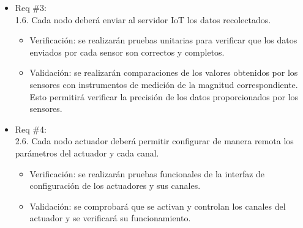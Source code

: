 \begin{itemize}
\begin{itemize}
\begin{itemize}
		            \end{itemize}
		      \item Req \#3: \\ 1.6. Cada nodo deberá enviar al servidor IoT los datos
		            recolectados.
		            \begin{itemize}
			            \item Verificación: se realizarán pruebas unitarias para verificar que los datos
			                  enviados por cada sensor son correctos y completos.
			            \item Validación: se realizarán comparaciones de los valores obtenidos por los
			                  sensores con instrumentos de medición de la magnitud correspondiente. Esto
			                  permitirá verificar la precisión de los datos proporcionados por los sensores.
		            \end{itemize}
		      \item Req \#4: \\ 2.6. Cada nodo actuador deberá permitir configurar de manera remota
		            los parámetros del actuador y cada canal.
		            \begin{itemize}
			            \item Verificación: se realizarán pruebas funcionales de la interfaz de configuración
			                  de los actuadores y sus canales.
			            \item Validación: se comprobará que se activan y controlan los canales del actuador y
			                  se verificará su funcionamiento.
		            \end{itemize}
	      \end{itemize}


\end{itemize}
